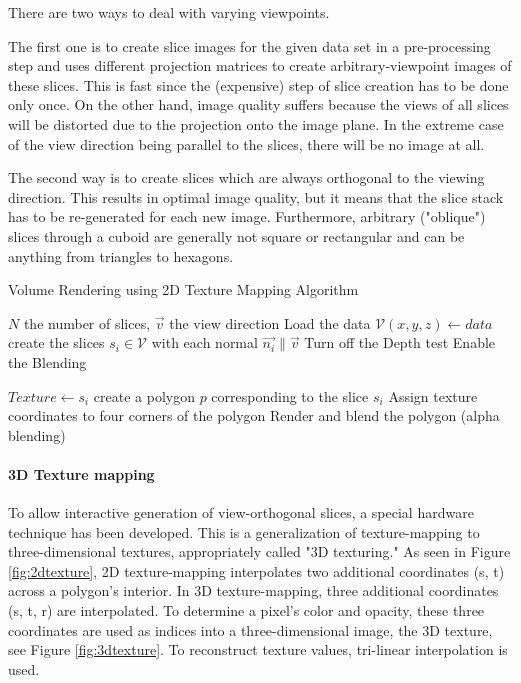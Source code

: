 There are two ways to deal with varying viewpoints.

The first one is to create slice images for the given data set in a pre-processing step and uses different projection matrices to create arbitrary-viewpoint images of these slices. This is fast since the (expensive) step of slice creation has to be done only once. On the other hand, image quality suffers because the views of all slices will be distorted due to the projection onto the image plane. In the extreme case of the view direction being parallel to the slices, there will be no image at all.

The second way is to create slices which are always orthogonal to the viewing direction. This results in optimal image quality, but it means that the slice stack has to be re-generated for each new image. Furthermore, arbitrary ("oblique") slices through a cuboid are generally not square or rectangular and can be anything from triangles to hexagons.

\begin{algorithm} \caption{Volume Rendering using 2D Texture Mapping Algorithm} 
\label{alg:tex2dmapping}
\begin{algorithmic}[1]
\Require $N$ the number of slices, $\vec{v} $ the view direction
\State Load the data $\mathcal V(x,y,z) \gets data$ 
\State create the slices $s_i \in \mathcal V$ with each normal $\vec{n_i} \parallel \vec{v}$
\State Turn off the Depth test 
\State Enable the Blending 

\State $Texture \gets s_i$
\State create a polygon $p$ corresponding to the slice $s_i$
\State Assign texture coordinates to four corners of the polygon
\State Render and blend the polygon (alpha blending) 
\EndFor

\end{algorithmic}
\end{algorithm}

\paragraph{3D Texture mapping}
To allow interactive generation of view-orthogonal slices, a special hardware technique has been developed. This is a generalization of texture-mapping to three-dimensional textures, appropriately called "3D texturing."
As seen in Figure \ref{fig:2dtexture}, 2D texture-mapping interpolates two additional coordinates (s, t) across a polygon's interior. In 3D texture-mapping, three additional coordinates (s, t, r) are interpolated. To determine a pixel's color and opacity, these three coordinates are used as indices into a three-dimensional image, the 3D texture, see Figure \ref{fig:3dtexture}. To reconstruct texture values, tri-linear interpolation is used.

